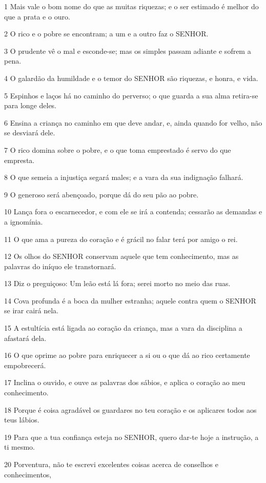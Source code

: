 \par 1 Mais vale o bom nome do que as muitas riquezas; e o ser estimado é melhor do que a prata e o ouro.
\par 2 O rico e o pobre se encontram; a um e a outro faz o SENHOR.
\par 3 O prudente vê o mal e esconde-se; mas os simples passam adiante e sofrem a pena.
\par 4 O galardão da humildade e o temor do SENHOR são riquezas, e honra, e vida.
\par 5 Espinhos e laços há no caminho do perverso; o que guarda a sua alma retira-se para longe deles.
\par 6 Ensina a criança no caminho em que deve andar, e, ainda quando for velho, não se desviará dele.
\par 7 O rico domina sobre o pobre, e o que toma emprestado é servo do que empresta.
\par 8 O que semeia a injustiça segará males; e a vara da sua indignação falhará.
\par 9 O generoso será abençoado, porque dá do seu pão ao pobre.
\par 10 Lança fora o escarnecedor, e com ele se irá a contenda; cessarão as demandas e a ignomínia.
\par 11 O que ama a pureza do coração e é grácil no falar terá por amigo o rei.
\par 12 Os olhos do SENHOR conservam aquele que tem conhecimento, mas as palavras do iníquo ele transtornará.
\par 13 Diz o preguiçoso: Um leão está lá fora; serei morto no meio das ruas.
\par 14 Cova profunda é a boca da mulher estranha; aquele contra quem o SENHOR se irar cairá nela.
\par 15 A estultícia está ligada ao coração da criança, mas a vara da disciplina a afastará dela.
\par 16 O que oprime ao pobre para enriquecer a si ou o que dá ao rico certamente empobrecerá.
\par 17 Inclina o ouvido, e ouve as palavras dos sábios, e aplica o coração ao meu conhecimento.
\par 18 Porque é coisa agradável os guardares no teu coração e os aplicares todos aos teus lábios.
\par 19 Para que a tua confiança esteja no SENHOR, quero dar-te hoje a instrução, a ti mesmo.
\par 20 Porventura, não te escrevi excelentes coisas acerca de conselhos e conhecimentos,
